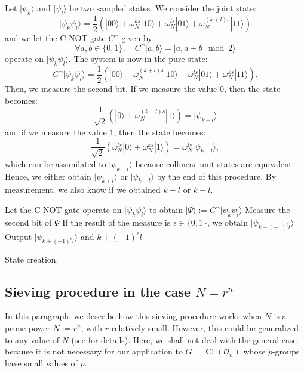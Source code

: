 \documentclass[a4paper,10pt,notitlepage]{report}
\theoremstyle{definition}
\theoremstyle{plain}
\theoremstyle{definition}
\newcommand{\mO}{\mathcal{O}}
\renewcommand{\(}{\left(}
\renewcommand{\)}{\right)}
\DeclareMathOperator{\Cl}{Cl}
\begin{document}
Let $|\psi_k\rangle$ and $|\psi_l\rangle$ be two sampled states. We consider the joint state:
\[|\psi_k\psi_l\rangle=\frac{1}{2}\(|00\rangle+\omega_N^{ks}|10\rangle+\omega_N^{ls}|01\rangle+\omega_N^{(k+l)s}|11\rangle\)\]
and we let the C-NOT gate $C^{\lnot}$ given by:
\[\forall a, b\in\{0,1\}, \quad C^{\lnot}|a,b\rangle=|a,a+b \mod 2\rangle\]
operate on $|\psi_k\psi_l\rangle$. The system is now in the pure state:
\[C^{\lnot}|\psi_k\psi_l\rangle=\frac{1}{2}\(|00\rangle+\omega_N^{(k+l)s}|10\rangle+\omega_N^{ls}|01\rangle+\omega_N^{ks}|11\rangle\).\]
Then, we measure the second bit. If we measure the value $0$, then the state becomes:
\[\frac{1}{\sqrt{2}}\(|0\rangle +\omega_N^{(k+l)s}|1\rangle\)=|\psi_{k+l}\rangle\]
and if we measure the value $1$, then the state becomes:
\[\frac{1}{\sqrt{2}}\(\omega_N^{ls}|0\rangle +\omega_N^{ks}|1\rangle\)=\omega_N^{ls}|\psi_{k-l}\rangle,\]
which can be assimilated to $|\psi_{k-l}\rangle$ because collinear unit states are equivalent. Hence, we either obtain $|\psi_{k+l}\rangle$ or $|\psi_{k-l}\rangle$ by the end of this procedure.  By measurement, we also know if we obtained $k+l$ or $k-l$.

\begin{algorithm}[!h]\label{Algorithm 13}
\SetAlgoLined
{}

Let the C-NOT gate operate on $|\psi_k\psi_l\rangle$ to obtain $|\Psi\rangle:=C^{\lnot}|\psi_k\psi_l\rangle$\;
Measure the second bit of $\Psi$\;
If the result of the measure is $\epsilon\in\{0,1\}$, we obtain $|\psi_{k+(-1)^\epsilon l}\rangle$\;
Output $|\psi_{k+(-1)^\epsilon l}\rangle$ and $k+(-1)^\epsilon l$\;

\caption{State creation.}
\end{algorithm}

\subsection{Sieving procedure in the case $N=r^n$}

In this paragraph, we describe how this sieving procedure works when $N$ is a prime power $N:=r^n$, with $r$ relatively small. However, this could be generalized to any value of $N$ (see \cite[Algorithm 2]{Kuperberg} for details). Here, we shall not deal with the general case because it is not necessary for our application to $G=\Cl(\mO_n)$ whose $p$-groups have small values of $p$.
\end{document}
